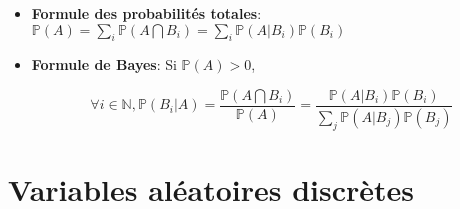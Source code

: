 \documentclass[10pt,a4paper,oneside]{article}
\begin{document}
\begin{itemize}
\begin{itemize}
\item
\textbf{Formule des probabilités totales}: $\mathbb{P}(A) = \sum_i \mathbb{P}(A \bigcap B_i) = \sum_i \mathbb{P}(A|B_i) \mathbb{P}(B_i)$

\item
\textbf{Formule de Bayes}: Si $\mathbb{P}(A) > 0$,

\[ \forall i \in \mathbb{N}, \mathbb{P}(B_i|A) = \frac{\mathbb{P}(A \bigcap B_i)}{\mathbb{P}(A)} = \frac{\mathbb{P}(A|B_i)\mathbb{P}(B_i)}{\sum_j \mathbb{P}(A|B_j)\mathbb{P}(B_j)} \]
\end{itemize}

\end{itemize}

\section{Variables aléatoires discrètes}
\end{document}
